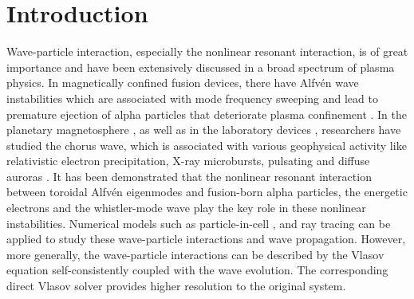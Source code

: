 \section{Introduction}
Wave-particle interaction, especially the nonlinear resonant interaction, is of great importance and have been extensively discussed in a broad spectrum of plasma physics. 
In magnetically confined fusion devices, there have Alfv\'en wave instabilities \cite{chen2016,wang2018,wang2012,wang2012a} which are associated with mode frequency sweeping and lead to premature ejection of alpha particles that deteriorate plasma confinement \cite{fasoli2007}.
In the planetary magnetosphere \cite{tsurutani1974}, as well as in the laboratory devices \cite{vancompernolle2015,vancompernolle2017a}, researchers have studied the chorus wave, which is associated with various geophysical activity like relativistic electron precipitation, X-ray microbursts, pulsating and diffuse auroras \cite{kasahara2018,reeves2013,thorne2013}.
It has been demonstrated that the nonlinear resonant interaction between toroidal Alfv\'en eigenmodes and fusion-born alpha particles, the energetic electrons and the whistler-mode wave play the key role in these nonlinear instabilities.
Numerical models such as particle-in-cell \cite{chen2015a,xiao2013variational,xiao2020explicit,Xiao2015,xiao2018structure}, and ray tracing \cite{xie2022} can be applied to study these wave-particle interactions and wave propagation. 
However, more generally, the wave-particle interactions can be described by the Vlasov equation self-consistently coupled with the wave evolution.
The corresponding direct Vlasov solver provides higher resolution to the original system. 

